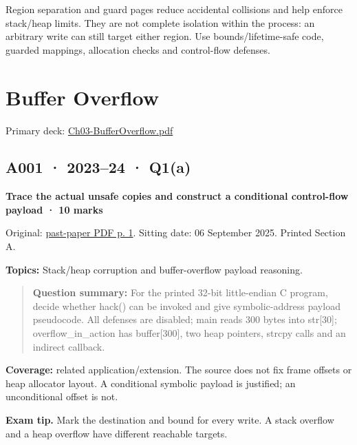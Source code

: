 \documentclass[11pt,a4paper]{article}
\begin{document}
Region separation and guard pages reduce accidental collisions and help enforce stack/\allowbreak{}heap limits. They are not complete isolation within the process: an arbitrary write can still target either region. Use bounds/\allowbreak{}lifetime-safe code,\allowbreak{} guarded mappings,\allowbreak{} allocation checks and control-flow defenses.



\clearpage
\section{Buffer Overflow}

Primary deck: \href{../slides/Ch03-BufferOverflow.pdf}{Ch03-BufferOverflow.\allowbreak{}pdf}




\subsection{A001 · 2023–24 · Q1(a)}\label{a001}

\textbf{Trace the actual unsafe copies and construct a conditional control-flow payload · 10 marks}


Original: \href{../../CSE405-Security_Merged.pdf\#page=1}{past-paper PDF p. 1}. Sitting date: 06 September 2025. Printed Section A.


\textbf{Topics:} Stack/\allowbreak{}heap corruption and buffer-overflow payload reasoning.



\begin{quote}\small

\textbf{Question summary:} For the printed 32-bit little-endian C program,\allowbreak{} decide whether hack() can be invoked and give symbolic-address payload pseudocode. All defenses are disabled; main reads 300 bytes into str[30]; overflow\_in\_action has buffer[300],\allowbreak{} two heap pointers,\allowbreak{} strcpy calls and an indirect callback.



\end{quote}

\textbf{Coverage:} related application/\allowbreak{}extension. The source does not fix frame offsets or heap allocator layout. A conditional symbolic payload is justified; an unconditional offset is not.



{\color{ForestGreen}\textbf{Exam tip.} Mark the destination and bound for every write. A stack overflow and a heap overflow have different reachable targets.}
\end{document}
